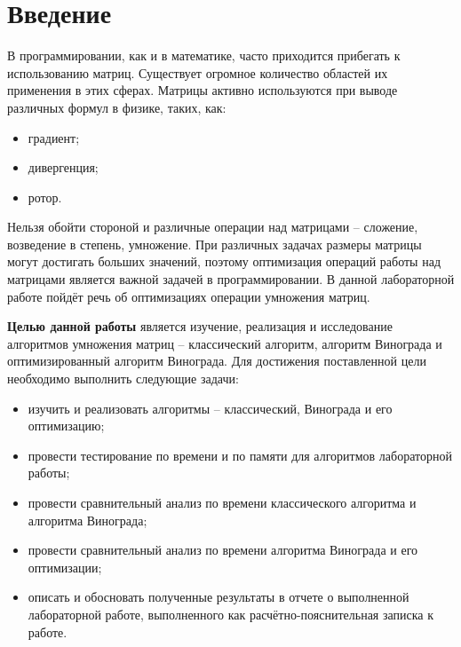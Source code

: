 \chapter*{Введение}

В программировании, как и в математике, часто приходится прибегать к использованию матриц. 
Существует огромное количество областей их применения в этих сферах. 
Матрицы активно используются при выводе различных формул в физике, таких, как:
\begin{itemize}
    \item градиент;
    \item дивергенция;
    \item ротор.
\end{itemize}

Нельзя обойти стороной и различные операции над матрицами -- сложение, возведение в степень, умножение. 
При различных задачах размеры матрицы могут достигать больших значений, поэтому оптимизация операций работы над матрицами является важной задачей в программировании. 
В данной лабораторной работе пойдёт речь об оптимизациях операции умножения матриц.


\textbf{Целью данной работы} является изучение, реализация и исследование алгоритмов умножения матриц -- классический алгоритм, алгоритм Винограда и оптимизированный алгоритм Винограда. 
Для достижения поставленной цели необходимо выполнить следующие задачи:
\begin{itemize}
	\item изучить и реализовать алгоритмы -- классический, Винограда и его оптимизацию;
    \item провести тестирование по времени и по памяти для алгоритмов лабораторной работы;
    \item провести сравнительный анализ по времени классического алгоритма и алгоритма Винограда;
    \item провести сравнительный анализ по времени алгоритма Винограда и его оптимизации;
	\item описать и обосновать полученные результаты в отчете о выполненной лабораторной работе, выполненного как расчётно-пояснительная записка к работе.
\end{itemize}
